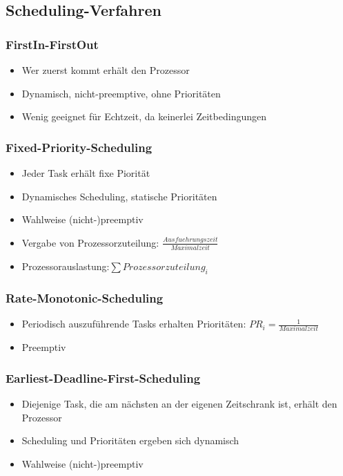 \subsection{Scheduling-Verfahren}

\subsubsection{FirstIn-FirstOut}
\begin{itemize}
	\item Wer zuerst kommt erhält den Prozessor
	\item Dynamisch, nicht-preemptive, ohne Prioritäten
	\item Wenig geeignet für Echtzeit, da keinerlei Zeitbedingungen
\end{itemize}

\subsubsection{Fixed-Priority-Scheduling}
\begin{itemize}
	\item Jeder Task erhält fixe Piorität
	\item Dynamisches Scheduling, statische Prioritäten
	\item Wahlweise (nicht-)preemptiv
	\item Vergabe von Prozessorzuteilung: \(\frac{Ausfuehrungszeit}{Maximalzeit}\)
	\item Prozessorauslastung:\(\sum Prozessorzuteilung_i\)
\end{itemize}

\subsubsection{Rate-Monotonic-Scheduling}
\begin{itemize}
	\item Periodisch auszuführende Tasks erhalten Prioritäten: \(PR_i =\frac{1}{Maximalzeit}\) 
	\item Preemptiv
\end{itemize}

\subsubsection{Earliest-Deadline-First-Scheduling}
\begin{itemize}
	\item Diejenige Task, die am nächsten an der eigenen Zeitschrank ist, erhält den Prozessor
	\item Scheduling und Prioritäten ergeben sich dynamisch
	\item Wahlweise (nicht-)preemptiv
\end{itemize}


